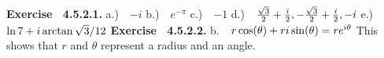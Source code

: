  {\noindent \protect \bf  Exercise ~4.5.2.1.} a.)~~$-i$ \protect \newline  b.)~~$e^{-\pi }$ \protect \newline  c.)~~$-1$ \protect \newline  d.)~~$\protect \frac  {\protect \sqrt  {3}}{2} + \protect \frac  {i}{2}, -\protect \frac  {\protect \sqrt  {3}}{2} + \protect \frac  {i}{2}, -i$ \protect \newline  e.)~~$\protect \qopname  \relax o{ln}{7} + i \protect \qopname  \relax o{arctan}{\protect \sqrt  {3}/12}$  \protect \newline  \protect \newline  
 {\noindent \protect \bf  Exercise ~4.5.2.2.} b.~~$r\protect \qopname  \relax o{cos}(\theta )+ri \protect \qopname  \relax o{sin}(\theta ) = re^{i \theta }$ This shows that $r$ and $\theta $ represent a radius and an angle.  \protect \newline  \protect \newline  
